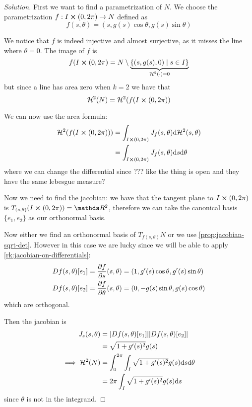 \documentclass[12pt]{extarticle}
\begin{document}
\begin{proof}[Solution]
	First we want to find a parametrization of $N$.
	We choose the parametrization $f: I \cross (0, 2 \pi) \to N$ defined as
	\begin{equation}
		f(s, \theta) = (s, g(s) \cos \theta, g(s) \sin \theta)
	\end{equation}

	We notice that $f$ is indeed injective and almost surjective, as it misses the line where
	$\theta = 0$. The image of $f$ is
	\begin{equation}
		f(I \cross (0, 2\pi) =
		N \setminus \underbrace{\{ (s, g(s), 0) \mid s \in I \}}_{\mathcal H^2(\cdot) = 0}
	\end{equation}
	but since a line has area zero when $k = 2$ we have that
	\begin{equation}
		\mathcal H^2(N) = \mathcal H^2(f(I \cross (0, 2\pi))
	\end{equation}

	We can now use the area formula:
	\begin{align}
		\mathcal H^2(f(I \cross (0, 2\pi))) & = \int_{I \cross (0, 2\pi)} J_f(s, \theta) \dd \mathcal
		H^2(s, \theta)                                                                                    \\
		                                    & = \int_{I \cross (0, 2\pi)} J_f(s, \theta) \dd s \dd \theta
	\end{align}
	where we can change the differential since ??? like the thing is open and they have the same
	lebesgue measure?

	Now we need to find the jacobian: we have that the tangent plane to $I \cross (0, 2\pi)$ is
	$T_{(s, \theta)}(I\cross (0,2\pi)) = \R^2$, therefore we can take the canonical basis
	$\{ e_1, e_2 \}$ as our orthonormal basis.

	Now either we find an orthonormal basis of $T_{f(s, \theta)} N$ or we use
	\cref{prop:jacobian-sqrt-det}. However in this case we are lucky since we will be able to apply
	\cref{rk:jacobian-on-differentials}:
	\begin{align}
		Df(s, \theta)[e_1] = \pdv{f}{s}()(s, \theta)      & = (1, g'(s) \cos \theta, g'(s) \sin \theta) \\
		Df(s, \theta)[e_2] = \pdv{f}{\theta}()(s, \theta) & = (0, -g(s) \sin \theta, g(s) \cos \theta)
	\end{align}
	which are orthogonal.

	Then the jacobian is
	\begin{align}
		J_s(s, \theta)           & = \abs{Df(s, \theta)[e_1]} \abs{Df(s, \theta)[e_2]}           \\
		                         & = \sqrt{1+g'(s)^2} g(s)                                       \\
		\implies \mathcal H^2(N) & = \int_0^{2\pi} \int_I \sqrt{1+g'(s)^2} g(s) \dd s \dd \theta \\
		                         & = 2 \pi \int_I \sqrt{1+g'(s)^2} g(s) \dd s
	\end{align}
	since $\theta$ is not in the integrand.
\end{proof}
\end{document}
